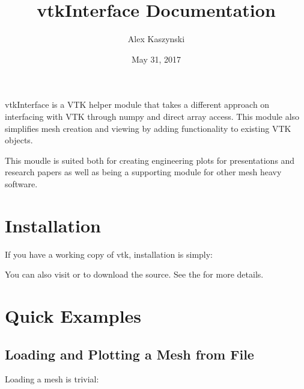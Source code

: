 \documentclass[letterpaper,10pt,english]{sphinxmanual}
\title{vtkInterface Documentation}
\date{May 31, 2017}
\author{Alex Kaszynski}
\begin{document}
\maketitle
\sphinxtableofcontents
{}\label{\detokenize{index::doc}}


vtkInterface is a VTK helper module that takes a different approach on interfacing with VTK through numpy and direct array access.  This module also simplifies mesh creation and viewing by adding functionality to existing VTK objects.

This moudle is suited both for creating engineering plots for presentations and research papers as well as being a supporting module for other mesh heavy software.


\chapter{Installation}
\label{\detokenize{index:vtkinterface-overview}}\label{\detokenize{index:installation}}
If you have a working copy of vtk, installation is simply:

\begin{sphinxVerbatim}[commandchars=\\\{\}]
  
\end{sphinxVerbatim}

You can also visit  or  to download the source.  See the {\hyperref[\detokenize{installation:install-ref}]{}} for more details.


\chapter{Quick Examples}
\label{\detokenize{index:quick-examples}}

\section{Loading and Plotting a Mesh from File}
\label{\detokenize{index:loading-and-plotting-a-mesh-from-file}}
Loading a mesh is trivial:

\begin{sphinxVerbatim}[commandchars=\\\{\}]
 
  
\end{sphinxVerbatim}
\end{document}
